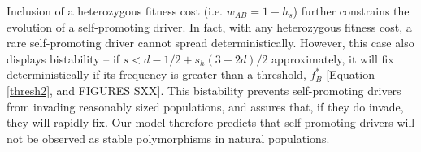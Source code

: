 \documentclass[12pt,letterpaper]{article}
\newcommand{\yb}[1]{{ \color{blue} #1}}
\begin{document}
Inclusion of a heterozygous fitness cost (i.e. $w_{AB}=1-h_s$)
further constrains the evolution of a self-promoting driver. 
In fact, with any heterozygous fitness cost, a rare self-promoting
driver cannot spread deterministically. 
However, this case also displays bistability -- 
if $s < d - 1/2+s_h(3-2d)/2$ approximately, it will fix deterministically if its 
	frequency is greater than a threshold, $f_B^*$ [Equation \eqref{thresh2}, and \yb{FIGURES SXX}].
This bistability prevents self-promoting drivers from invading 	
	reasonably sized populations, and assures that, if they do invade, they will rapidly fix.
Our model therefore predicts that self-promoting drivers will not be
observed as stable polymorphisms in natural populations. 
\end{document}
